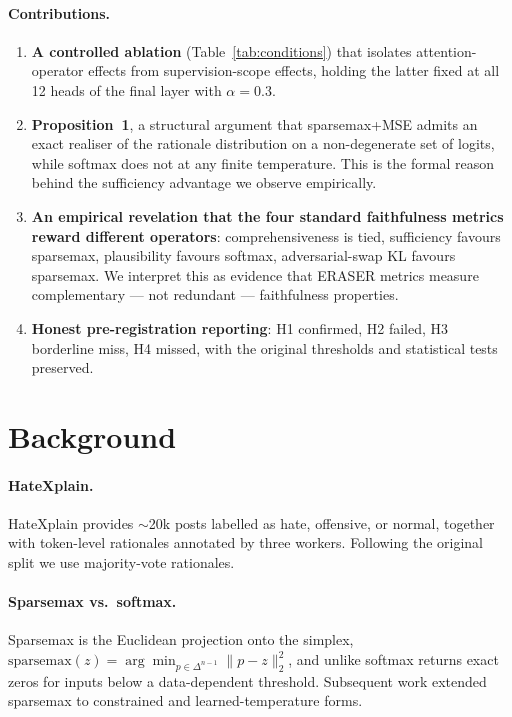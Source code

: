 \documentclass{article}
\begin{document}
\paragraph{Contributions.}
\begin{enumerate}
\item \textbf{A controlled ablation} (Table~\ref{tab:conditions}) that isolates
  attention-operator effects from supervision-scope effects, holding the latter fixed
  at all 12 heads of the final layer with $\alpha{=}0.3$.
\item \textbf{Proposition~1}, a structural argument that sparsemax+MSE admits an exact
  realiser of the rationale distribution on a non-degenerate set of logits, while
  softmax does not at any finite temperature. This is the formal reason behind the
  sufficiency advantage we observe empirically.
\item \textbf{An empirical revelation that the four standard faithfulness metrics
  reward different operators}: comprehensiveness is tied, sufficiency favours
  sparsemax, plausibility favours softmax, adversarial-swap KL favours sparsemax. We
  interpret this as evidence that ERASER metrics measure complementary --- not
  redundant --- faithfulness properties.
\item \textbf{Honest pre-registration reporting}: H1 confirmed, H2 failed, H3 borderline
  miss, H4 missed, with the original thresholds and statistical tests preserved.
\end{enumerate}

\section{Background}
\label{sec:background}

\paragraph{HateXplain.} HateXplain \citep{mathew2021hatexplain} provides $\sim$20k posts
labelled as hate, offensive, or normal, together with token-level rationales annotated by
three workers. Following the original split we use majority-vote rationales.

\paragraph{Sparsemax vs.\ softmax.} Sparsemax \citep{martins2016sparsemax} is the
Euclidean projection onto the simplex,
$\mathrm{sparsemax}(z) = \arg\min_{p \in \Delta^{n-1}} \|p - z\|_2^2$, and unlike softmax
returns exact zeros for inputs below a data-dependent threshold. Subsequent work extended
sparsemax to constrained \citep{malaviya2018sparse} and learned-temperature
\citep{correia2019adaptively} forms.
\end{document}
